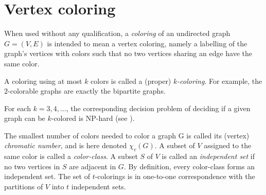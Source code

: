 \section{Vertex coloring}

When used without any qualification, a {\it coloring} of an
undirected graph $G=(V,E)$ is intended
to mean a vertex coloring, namely a labelling of the graph's
vertices with colors such that no two vertices sharing an
edge have the same color.

A coloring using at most $k$ colors is called a (proper) {\it $k$-coloring}.
For example, the $2$-colorable graphs are exactly the bipartite graphs.

\begin{remark}
For each $k=3,4,\dots$, the corresponding decision problem of deciding
if a given graph can be $k$-colored is NP-hard
(see \cite{JaegerEtAl1990}).
\end{remark}

The smallest number of colors needed to color a graph G is called
its (vertex) {\it chromatic number}, and is here denoted $\chi_v(G)$.
A subset of $V$ assigned to the same color is called a {\it color-class}.
A subset $S$ of $V$ is called an {\it independent set} if no two vertices
in $S$ are adjacent in $G$. By definition, every color-class forms
an independent set. The set of $t$-colorings is in one-to-one
correspondence with the partitions of $V$ into $t$ independent sets.

